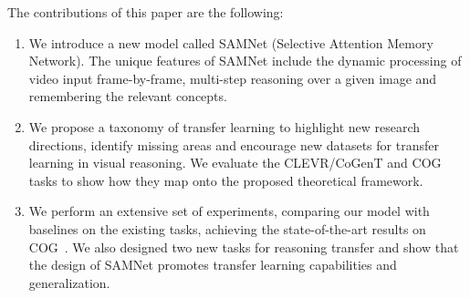 \noindent The contributions of this paper are the following:
\begin{enumerate}
	\item We introduce a new model called SAMNet (Selective Attention Memory Network).
	The unique features of SAMNet include the dynamic processing of video input frame-by-frame, multi-step reasoning over a given image and remembering the relevant concepts.
	\item We propose a taxonomy of transfer learning to highlight new research directions, identify missing areas and encourage new datasets for transfer learning in visual reasoning. We evaluate the CLEVR/CoGenT and COG tasks to show how they map onto the proposed theoretical framework.
	\item We perform an extensive set of experiments, comparing our model with baselines on the existing tasks, achieving the state-of-the-art results on COG~\cite{yang2018dataset}. We also designed two new tasks for reasoning transfer and show that the design of SAMNet promotes transfer learning capabilities and generalization.

\end{enumerate}
